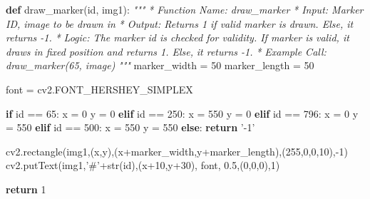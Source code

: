 \documentclass[]{article}
\newenvironment{Shaded}{}{}
\newcommand{\KeywordTok}[1]{\textcolor[rgb]{0.00,0.44,0.13}{\textbf{{#1}}}}
\newcommand{\DecValTok}[1]{\textcolor[rgb]{0.25,0.63,0.44}{{#1}}}
\newcommand{\FloatTok}[1]{\textcolor[rgb]{0.25,0.63,0.44}{{#1}}}
\newcommand{\StringTok}[1]{\textcolor[rgb]{0.25,0.44,0.63}{{#1}}}
\newcommand{\CommentTok}[1]{\textcolor[rgb]{0.38,0.63,0.69}{\textit{{#1}}}}
\newcommand{\ControlFlowTok}[1]{\textcolor[rgb]{0.00,0.44,0.13}{\textbf{{#1}}}}
\newcommand{\OperatorTok}[1]{\textcolor[rgb]{0.40,0.40,0.40}{{#1}}}
\newcommand{\BuiltInTok}[1]{{#1}}
\newcommand{\NormalTok}[1]{{#1}}
\begin{document}
\begin{Shaded}
\begin{Highlighting}[]
    
\KeywordTok{def} \NormalTok{draw_marker(}\BuiltInTok{id}\NormalTok{, img1):}
    \CommentTok{"""}
\CommentTok{    * Function Name:    draw_marker}
\CommentTok{    * Input:        Marker ID, image to be drawn in}
\CommentTok{    * Output:       Returns 1 if valid marker is drawn. Else, it returns -1.}
\CommentTok{    * Logic:        The marker id is checked for validity. If marker is}
\CommentTok{                        valid, it draws in fixed position and returns 1. Else,}
\CommentTok{                        it returns -1.}
\CommentTok{    * Example Call: draw_marker(65, image)}
\CommentTok{    """}
    \NormalTok{marker_width }\OperatorTok{=} \DecValTok{50}
    \NormalTok{marker_length }\OperatorTok{=} \DecValTok{50}
    
    \NormalTok{font }\OperatorTok{=} \NormalTok{cv2.FONT_HERSHEY_SIMPLEX}

    \ControlFlowTok{if} \BuiltInTok{id} \OperatorTok{==} \DecValTok{65}\NormalTok{:}
        \NormalTok{x }\OperatorTok{=} \DecValTok{0}
        \NormalTok{y }\OperatorTok{=} \DecValTok{0}
    \ControlFlowTok{elif} \BuiltInTok{id} \OperatorTok{==} \DecValTok{250}\NormalTok{:}
        \NormalTok{x }\OperatorTok{=} \DecValTok{550}
        \NormalTok{y }\OperatorTok{=} \DecValTok{0}
    \ControlFlowTok{elif} \BuiltInTok{id} \OperatorTok{==} \DecValTok{796}\NormalTok{:}
        \NormalTok{x }\OperatorTok{=} \DecValTok{0}
        \NormalTok{y }\OperatorTok{=} \DecValTok{550}
    \ControlFlowTok{elif} \BuiltInTok{id} \OperatorTok{==} \DecValTok{500}\NormalTok{:}
        \NormalTok{x }\OperatorTok{=} \DecValTok{550}
        \NormalTok{y }\OperatorTok{=} \DecValTok{550}
    \ControlFlowTok{else}\NormalTok{:}
        \ControlFlowTok{return} \StringTok{'-1'}
    
    \NormalTok{cv2.rectangle(img1,(x,y),(x}\OperatorTok{+}\NormalTok{marker_width,y}\OperatorTok{+}\NormalTok{marker_length),(}\DecValTok{255}\NormalTok{,}\DecValTok{0}\NormalTok{,}\DecValTok{0}\NormalTok{,}\DecValTok{10}\NormalTok{),}\OperatorTok{-}\DecValTok{1}\NormalTok{)}
    \NormalTok{cv2.putText(img1,}\StringTok{'#'}\OperatorTok{+}\BuiltInTok{str}\NormalTok{(}\BuiltInTok{id}\NormalTok{),(x}\DecValTok{+10}\NormalTok{,y}\DecValTok{+30}\NormalTok{), font, }\FloatTok{0.5}\NormalTok{,(}\DecValTok{0}\NormalTok{,}\DecValTok{0}\NormalTok{,}\DecValTok{0}\NormalTok{),}\DecValTok{1}\NormalTok{)}

    \ControlFlowTok{return} \DecValTok{1}



\end{Highlighting}
\end{Shaded}
\end{document}
